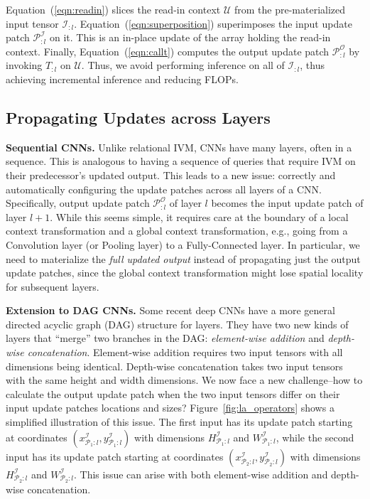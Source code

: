 Equation~(\ref{eqn:readin}) slices the read-in context $\mathcal{U}$ from the pre-materialized input tensor $\mathcal{I}_{:l}$. Equation~(\ref{eqn:superposition}) superimposes the input update patch $\mathcal{P}^\mathcal{I}_{:l}$ on it. This is an in-place update of the array holding the read-in context. Finally, Equation~(\ref{eqn:callt}) computes the output update patch $\mathcal{P}^{\mathcal{O}}_{:l}$ by invoking $T_{:l}$ on $\mathcal{U}$. Thus, we avoid performing inference on all of $\mathcal{I}_{:l}$, thus achieving incremental inference and reducing FLOPs.


\subsection{Propagating Updates across Layers}

\vspace{2mm}
\noindent \textbf{Sequential CNNs.} Unlike relational IVM, CNNs have many layers, often in a sequence. This is analogous to having a sequence of queries that require IVM on their predecessor's updated output. This leads to a new issue: correctly and automatically configuring the update patches across all layers of a CNN. Specifically, output update patch $\mathcal{P}^{\mathcal{O}}_{:l}$ of layer $l$ becomes the input update patch of layer $l+1$. While this seems simple, it requires care at the boundary of a local context transformation and a global context transformation, e.g., going from a Convolution layer (or Pooling layer) to a Fully-Connected layer. In particular, we need to materialize the \textit{full updated output} instead of propagating just the output update patches, since the global context transformation might lose spatial locality for subsequent layers.

\vspace{2mm}
\noindent \textbf{Extension to DAG CNNs.} Some recent deep CNNs have a more general directed acyclic graph (DAG) structure for layers. They have two new kinds of layers that ``merge'' two branches in the DAG: \textit{element-wise addition} and \textit{depth-wise concatenation}. Element-wise addition requires two input tensors with all dimensions being identical. Depth-wise concatenation takes two input tensors with the same height and width dimensions. We now face a new challenge--how to calculate the output update patch when the two input tensors differ on their input update patches locations and sizes? Figure~\ref{fig:la_operators} shows a simplified illustration of this issue. The first input has its update patch starting at coordinates $(x^\mathcal{I}_{\mathcal{P}_1:l},y^\mathcal{I}_{\mathcal{P}_1:l})$ with dimensions $H^\mathcal{I}_{\mathcal{P}_1:l}$ and $W^\mathcal{I}_{\mathcal{P}_1:l}$, while the second input has its update patch starting at coordinates $(x^\mathcal{I}_{\mathcal{P}_2:l},y^\mathcal{I}_{\mathcal{P}_2:l})$ with dimensions $H^\mathcal{I}_{\mathcal{P}_2:l}$ and $W^\mathcal{I}_{\mathcal{P}_2:l}$. This issue can arise with both element-wise addition and depth-wise concatenation. 

